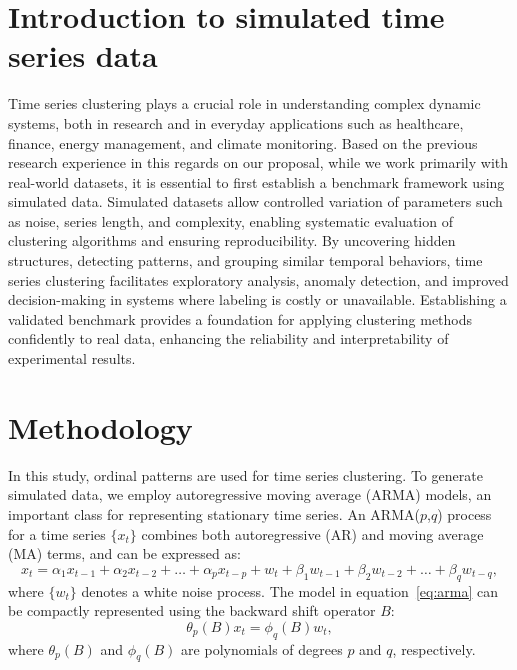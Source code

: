 \documentclass[12pt,a4paper]{article}
\begin{document}
\section{Introduction to simulated time series data}
Time series clustering plays a crucial role in understanding complex dynamic systems, both in research and in everyday applications such as healthcare, finance, energy management, and climate monitoring. Based on the previous research experience in this regards on our proposal, while we work primarily with real-world datasets, it is essential to first establish a benchmark framework using simulated data. Simulated datasets allow controlled variation of parameters such as noise, series length, and complexity, enabling systematic evaluation of clustering algorithms and ensuring reproducibility. By uncovering hidden structures, detecting patterns, and grouping similar temporal behaviors, time series clustering facilitates exploratory analysis, anomaly detection, and improved decision-making in systems where labeling is costly or unavailable. Establishing a validated benchmark provides a foundation for applying clustering methods confidently to real data, enhancing the reliability and interpretability of experimental results.
	
\section{Methodology}

In this study, ordinal patterns are used for time series clustering. To generate simulated data, we employ autoregressive moving average (ARMA) models, an important class for representing stationary time series. An ARMA($p$,$q$) process for a time series $\{x_t\}$ combines both autoregressive (AR) and moving average (MA) terms, and can be expressed as:
\begin{equation}
	x_t = \alpha_1 x_{t-1} + \alpha_2 x_{t-2} + \dots + \alpha_p x_{t-p} + w_t + \beta_1 w_{t-1} + \beta_2 w_{t-2} + \dots + \beta_q w_{t-q},
	\label{eq:arma}
\end{equation}
where $\{w_t\}$ denotes a white noise process. The model in equation~\eqref{eq:arma} can be compactly represented using the backward shift operator $B$:
\begin{equation}
	\theta_p(B) x_t = \phi_q(B) w_t,
	\label{eq:arma_polynomial}
\end{equation}
where $\theta_p(B)$ and $\phi_q(B)$ are polynomials of degrees $p$ and $q$, respectively.
\end{document}
